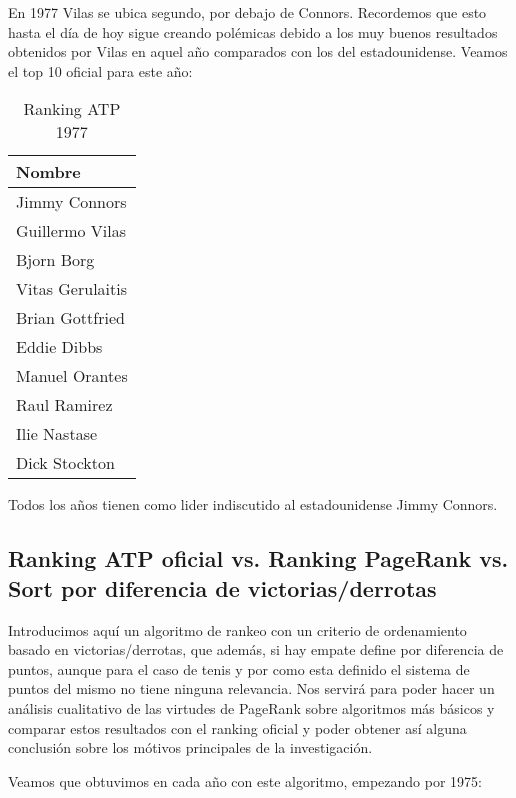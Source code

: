 En 1977 Vilas se ubica segundo, por debajo de Connors. Recordemos que esto hasta el día de hoy sigue creando polémicas debido a los muy buenos resultados obtenidos por Vilas en aquel año comparados con los del estadounidense.
Veamos el top 10 oficial para este año:

\begin{table}[H]
\label{my-label}
\begin{tabular}{l}
\hline
Nombre \\ \hline
Jimmy Connors \\
Guillermo Vilas \\
Bjorn Borg \\
Vitas Gerulaitis \\
Brian Gottfried \\
Eddie Dibbs \\
Manuel Orantes \\
Raul Ramirez \\
Ilie Nastase \\
Dick Stockton \\ \hline 
\end{tabular}
\centering
\caption{Ranking ATP 1977}
\end{table}

Todos los años tienen como lider indiscutido al estadounidense Jimmy Connors.

\subsection{Ranking ATP oficial vs. Ranking PageRank vs. Sort por diferencia de victorias/derrotas}

Introducimos aquí un algoritmo de rankeo con un criterio de ordenamiento basado en victorias/derrotas, que además, si hay empate define por diferencia de puntos, aunque para el caso de tenis y por como esta definido el sistema de puntos del mismo no tiene ninguna relevancia. Nos servirá para poder hacer un análisis cualitativo de las virtudes de PageRank sobre algoritmos más básicos y comparar estos resultados con el ranking oficial y poder obtener así alguna conclusión sobre los mótivos principales de la investigación.

Veamos que obtuvimos en cada año con este algoritmo, empezando por 1975:

